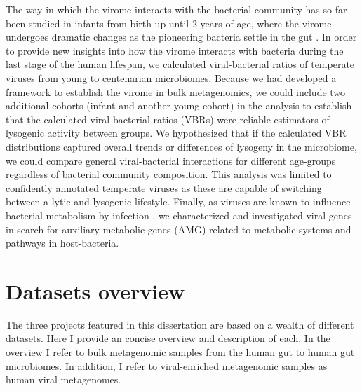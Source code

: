 \noindent
The way in which the virome interacts with the bacterial community has so far been studied in infants from birth up until 2 years of age, where the virome undergoes dramatic changes as the pioneering bacteria settle in the gut \cite{Liang2020-lr,Gregory2020-gu}. In order to provide new insights into how the virome interacts with bacteria during the last stage of the human lifespan, we calculated viral-bacterial ratios of temperate viruses from young to centenarian microbiomes. Because we had developed a framework to establish the virome in bulk metagenomics, we could include two additional cohorts (infant and another young cohort) in the analysis to establish that the calculated viral-bacterial ratios (VBRs) were reliable estimators of lysogenic activity between groups. We hypothesized that if the calculated VBR distributions captured overall trends or differences of lysogeny in the microbiome, we could compare general viral-bacterial interactions for different age-groups regardless of bacterial community composition. This analysis was limited to confidently annotated temperate viruses as these are capable of switching between a lytic and lysogenic lifestyle. Finally, as viruses are known to influence bacterial metabolism by infection \cite{Mayneris-Perxachs2022-wi}, we characterized and investigated viral genes in search for auxiliary metabolic genes (AMG) related to metabolic systems and pathways in host-bacteria.

\newpage
\section{Datasets overview}

The three projects featured in this dissertation are based on a wealth of different datasets. Here I provide an concise overview and description of each. In the overview I refer to bulk metagenomic samples from the human gut to human gut microbiomes. In addition, I refer to viral-enriched metagenomic samples as human viral metagenomes.

